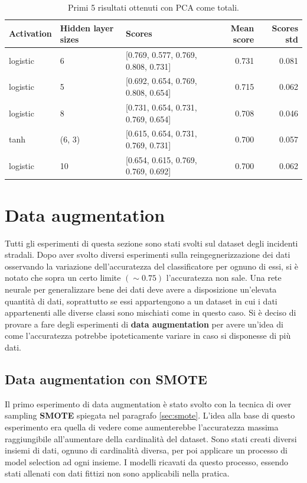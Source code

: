 \documentclass[12pt, twoside, letterpaper]{report}
\begin{document}
				\begin{table}
					\begin{tabular}{lllrr}
					\toprule
					Activation & Hidden layer sizes &                               Scores &  Mean score &  Scores std \\
					\midrule
					logistic &                  6 &  [0.769, 0.577, 0.769, 0.808, 0.731] &       0.731 &       0.081 \\
					logistic &                  5 &  [0.692, 0.654, 0.769, 0.808, 0.654] &       0.715 &       0.062 \\
					logistic &                  8 &  [0.731, 0.654, 0.731, 0.769, 0.654] &       0.708 &       0.046 \\
					tanh &             (6, 3) &  [0.615, 0.654, 0.731, 0.769, 0.731] &       0.700 &       0.057 \\
					logistic &                 10 &  [0.654, 0.615, 0.769, 0.769, 0.692] &       0.700 &       0.062 \\
					\bottomrule
					\end{tabular}
					\caption{Primi 5 risultati ottenuti con PCA come totali.}
					\label{tab:totali_pca}
				\end{table}
	
	\section{Data augmentation}
		Tutti gli esperimenti di questa sezione sono stati svolti sul dataset degli incidenti stradali. Dopo aver svolto diversi esperimenti sulla reingegnerizzazione dei dati osservando la variazione dell'accuratezza del classificatore per ognuno di essi, si è notato che sopra un certo limite $(\sim 0.75)$ l'accuratezza non sale. Una rete neurale per generalizzare bene dei dati deve avere a disposizione un'elevata quantità di dati, soprattutto se essi appartengono a un dataset in cui i dati appartenenti alle diverse classi sono mischiati come in questo caso.  Si è deciso di provare a fare degli esperimenti di \textbf{data augmentation} per avere un'idea di come l'accuratezza potrebbe ipoteticamente variare in caso si disponesse di più dati.
		
		\subsection{Data augmentation con SMOTE}
			Il primo esperimento di data augmentation è stato svolto con la tecnica di over sampling \textbf{SMOTE} spiegata nel paragrafo \ref{sec:smote}. L'idea alla base di questo esperimento era quella di vedere come aumenterebbe l'accuratezza massima raggiungibile all'aumentare della cardinalità del dataset. Sono stati creati diversi insiemi di dati, ognuno di cardinalità diversa, per poi applicare un processo di model selection ad ogni insieme. I modelli ricavati da questo processo, essendo stati allenati con dati fittizi non sono applicabili nella pratica. 
			
\end{document}
